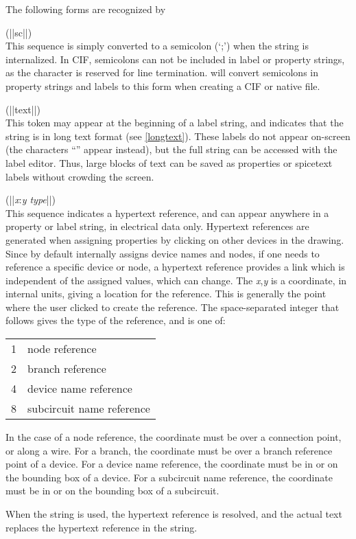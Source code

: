 The following forms are recognized by {\Xic}
\begin{description}
\item{\vt (||sc||)}\\
This sequence is simply converted to a semicolon (`{\vt ;}')
when the string is internalized.  In CIF, semicolons can not be
included in label or property strings, as the character is
reserved for line termination.  {\Xic} will convert
semicolons in property strings and labels to this form when
creating a CIF or native file.

\item{\vt (||text||)}\\
This token may appear at the beginning of a label string, and
indicates that the string is in long text format (see \ref{longtext}). 
These labels do not appear on-screen (the characters ``{\vt [text]}''
appear instead), but the full string can be accessed with the label
editor.  Thus, large blocks of text can be saved as properties or {\vt
spicetext} labels without crowding the screen.

\item{\vt (||}{\it x\/}:{\it y type\/}{\vt ||)}\\
This sequence indicates a hypertext reference, and can appear anywhere
in a property or label string, in electrical data only.  Hypertext
references are generated when assigning properties by clicking on
other devices in the drawing.  Since {\Xic} by default internally
assigns device names and nodes, if one needs to reference a specific
device or node, a hypertext reference provides a link which is
independent of the assigned values, which can change.  The {\it
x},{\it y} is a coordinate, in internal units, giving a location for
the reference.  This is generally the point where the user clicked to
create the reference.  The space-separated integer that follows gives
the type of the reference, and is one of:

\begin{tabular}{ll}
1 & node reference\\
2 & branch reference\\
4 & device name reference\\
8 & subcircuit name reference\\
\end{tabular}

In the case of a node reference, the coordinate must be over a
connection point, or along a wire.  For a branch, the coordinate must
be over a branch reference point of a device.  For a device name
reference, the coordinate must be in or on the bounding box of a
device.  For a subcircuit name reference, the coordinate must be in or
on the bounding box of a subcircuit.

When the string is used, the hypertext reference is resolved, and
the actual text replaces the hypertext reference in the string.
\end{description}

